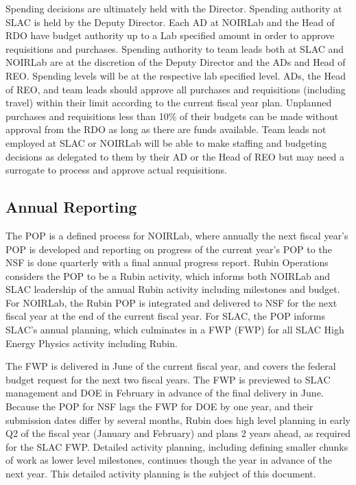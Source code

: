 Spending decisions are ultimately held with the Director. Spending authority at \gls{SLAC} is held by the Deputy Director. Each \gls{AD} at \gls{NOIRLab} and the Head of \gls{RDO} have budget authority up to a Lab specified amount in order to approve requisitions and purchases. Spending authority to team leads both at SLAC and NOIRLab are at the discretion of the Deputy Director and the \glspl{AD} and Head of REO. Spending levels will be at the respective lab specified level. \glspl{AD}, the Head of REO, and team leads should approve all purchases and requisitions (including travel) within their limit according to the current fiscal year plan. Unplanned purchases and requisitions less than 10\% of their budgets can be made without approval from the \gls{RDO} as long as there are funds available. Team leads not employed at \gls{SLAC} or \gls{NOIRLab} will be able to make staffing and budgeting decisions as delegated to them by their \gls{AD} or the Head of \gls{REO} but may need a surrogate to process and approve actual requisitions.

\subsection{Annual Reporting}
\label{sec:reporting}

The \gls{POP} is a defined process for \gls{NOIRLab}, where annually the next fiscal year's \gls{POP} is developed and reporting on progress of the current year's \gls{POP} to the \gls{NSF} is done quarterly with a final annual progress report.
\gls{Rubin Operations} considers the \gls{POP} to be a Rubin activity, which informs both \gls{NOIRLab} and \gls{SLAC} leadership of the annual Rubin activity including milestones and budget.
For \gls{NOIRLab}, the Rubin \gls{POP} is integrated and delivered to \gls{NSF} for the next fiscal year at the end of the current fiscal year.
For \gls{SLAC}, the \gls{POP} informs \gls{SLAC}'s annual planning, which culminates in a \gls{FWP} (FWP) for all \gls{SLAC} High Energy Physics activity including Rubin.

The \gls{FWP} is delivered in June of the current fiscal year, and covers the federal budget request for the next two fiscal years.
The \gls{FWP} is previewed to \gls{SLAC} management and \gls{DOE} in February in advance of the final delivery in June.
Because the \gls{POP} for \gls{NSF} lags the \gls{FWP} for \gls{DOE} by one year, and their submission dates differ by several months, Rubin does high level planning in early \gls{Q2} of the fiscal year (January and February) and plans 2 years ahead, as required for the \gls{SLAC} \gls{FWP}.
Detailed activity planning, including defining smaller chunks of work as lower level milestones, continues though the year in advance of the next year.
This detailed activity planning is the subject of this document.

